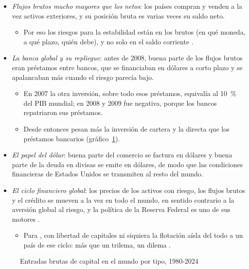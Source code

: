 \documentclass[11pt]{article}
\begin{document}
\begin{itemize}
\item \emph{Flujos brutos mucho mayores que los netos}: los países compran y venden a la vez activos exteriores, y su posición bruta es varias veces su saldo neto.
  \begin{itemize}
  \item Por eso los riesgos para la estabilidad están en los brutos (en qué moneda, a qué plazo, quién debe), y no solo en el saldo corriente\nocite{LaneMilesiFerretti2018} .
  \end{itemize}
\item \emph{La banca global y su repliegue}: antes de 2008, buena parte de los flujos brutos eran préstamos entre bancos, que se financiaban en dólares a corto plazo y se apalancaban más cuando el riesgo parecía bajo\nocite{BrunoShin2015Cross}.
  \begin{itemize}
  \item En 2007 la otra inversión, sobre todo esos préstamos, equivalía al 10~\% del PIB mundial; en 2008 y 2009 fue negativa, porque los bancos repatriaron sus préstamos.
  \item Desde entonces pesan más la inversión de cartera y la directa que los préstamos bancarios (gráfico~\ref{fig:flujos-brutos})\nocite{FMI2026BOP}.
  \end{itemize}
\item \emph{El papel del dólar}: buena parte del comercio se factura en dólares y buena parte de la deuda en divisas se emite en dólares, de modo que las condiciones financieras de Estados Unidos se transmiten al resto del mundo\nocite{Gopinath2020DCP}.
\item \emph{El ciclo financiero global}: los precios de los activos con riesgo, los flujos brutos y el crédito se mueven a la vez en todo el mundo, en sentido contrario a la aversión global al riesgo, y la política de la Reserva Federal es uno de sus motores\nocite{Rey2013Dilema,MirandaAgrippinoRey2020} .
  \begin{itemize}
  \item Para , con libertad de capitales ni siquiera la flotación aísla del todo a un país de ese ciclo: más que un trilema, un dilema .
  \end{itemize}
\end{itemize}

\begin{figure}[H]
\centering
\caption{Entradas brutas de capital en el mundo por tipo, 1980-2024}\label{fig:flujos-brutos}
\end{figure}
\end{document}
